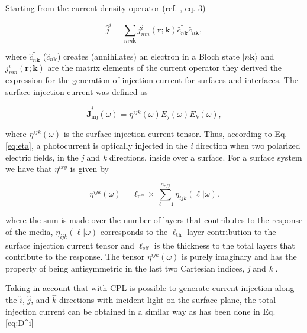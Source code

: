 \documentclass[aps,pra,11pt,tightenlines,showpacs,superscriptaddress,groupedaddress]{revtex4-1}
\newcommand{\ea}{$\eta^{ixy}$}
\begin{document}
Starting from the current density operator (ref. \cite{cabellos2011optical}, eq. 3)

\begin{equation}
    \hat{j}^{i} = \sum_{mn\textbf{k}} j^{i}_{nm}(\textbf{r};\textbf{k}) \hat{c}^{\dagger}_{n\textbf{k}} \hat{c}_{n\textbf{k}},
\end{equation}

\noindent where $\hat{c}^{\dagger}_{n\textbf{k}} $ ($\hat{c}_{n\textbf{k}} $) creates (annihilates) an electron in a Bloch state $\vert n\textbf{k} \rangle $ and $j^{i}_{nm}(\textbf{r};\textbf{k}) $ are the matrix elements of the current operator they derived the expression for the generation of injection current for surfaces
and interfaces. The surface injection current was defined as

\begin{equation}
    \mathbf{\dot{J}}^{i}_{\text{inj}}(\omega) =
    \eta^{ijk}(\omega)E_{j}(\omega)E_{k}(\omega), \label{eq:eta}
\end{equation}

\noindent where $\eta^{ijk}(\omega)$ is the surface injection current tensor.
Thus, according to Eq. \ref{eq:eta}, a photocurrent is optically injected in
the \emph{i} direction when two polarized electric fields, in the \emph{j} and
\emph{k} directions, inside over a surface. For a surface system we have that
{\ea} is given by \cite{cabellos2011optical, arzate2014optical}

\begin{equation}
    \eta^{ijk} (\omega) = \ell_{\text{eff}} \times \sum_{\ell=1}^{n_{eff}}
    \eta_{ijk} (\ell|\omega). \label{eq:etaeff}
\end{equation}

\noindent where the sum is made over the number of layers that contributes to
the response of the media, $\eta_{ijk} (\ell|\omega)$ corresponds to the
$\ell_{\text{th}}$-layer contribution to the surface injection current tensor
and $\ell_{\text{eff}}$ is the thickness to the total layers that contribute to
the response. The tensor $\eta^{ijk}(\omega)$ is purely imaginary and has the
property of being antisymmetric in the last two Cartesian indices, \emph{j} and
\emph{k} \cite{sipe2000second,nastos2006optical}.

Taking in account that with CPL is possible to generate current injection
along the $\hat{i}$, $\hat{j}$, and $\hat{k}$ directions with incident light on
the surface plane, the total injection current can be obtained in a similar way
as has been done in Eq. \ref{eq:D^i}
\end{document}
